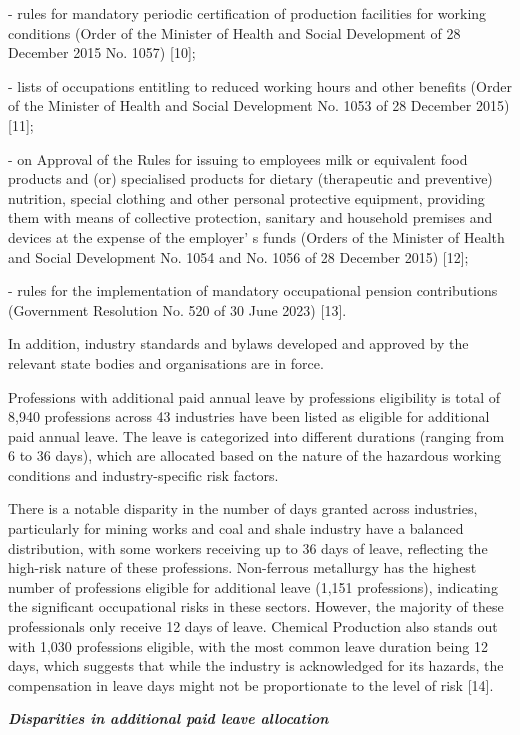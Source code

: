 \begin{multicols}{2}
- rules for mandatory periodic certification of production facilities
for working conditions (Order of the Minister of Health and Social
Development of 28 December 2015 No. 1057) {[}10{]};

- lists of occupations entitling to reduced working hours and other
benefits (Order of the Minister of Health and Social Development No.
1053 of 28 December 2015) {[}11{]};

- on Approval of the Rules for issuing to employees milk or equivalent
food products and (or) specialised products for dietary (therapeutic and
preventive) nutrition, special clothing and other personal protective
equipment, providing them with means of collective protection, sanitary
and household premises and devices at the expense of the
employer' s funds (Orders of the Minister of Health and
Social Development No. 1054 and No. 1056 of 28 December 2015) {[}12{]};

- rules for the implementation of mandatory occupational pension
contributions (Government Resolution No. 520 of 30 June 2023) {[}13{]}.

In addition, industry standards and bylaws developed and approved by the
relevant state bodies and organisations are in force.

Professions with additional paid annual leave by professions eligibility
is total of 8,940 professions across 43 industries have been listed as
eligible for additional paid annual leave. The leave is categorized into
different durations (ranging from 6 to 36 days), which are allocated
based on the nature of the hazardous working conditions and
industry-specific risk factors.

There is a notable disparity in the number of days granted across
industries, particularly for mining works and coal and shale industry
have a balanced distribution, with some workers receiving up to 36 days
of leave, reflecting the high-risk nature of these professions.
Non-ferrous metallurgy has the highest number of professions eligible
for additional leave (1,151 professions), indicating the significant
occupational risks in these sectors. However, the majority of these
professionals only receive 12 days of leave. Chemical Production also
stands out with 1,030 professions eligible, with the most common leave
duration being 12 days, which suggests that while the industry is
acknowledged for its hazards, the compensation in leave days might not
be proportionate to the level of risk {[}14{]}.

\emph{{\bfseries Disparities in additional paid leave allocation}}


\end{multicols}

